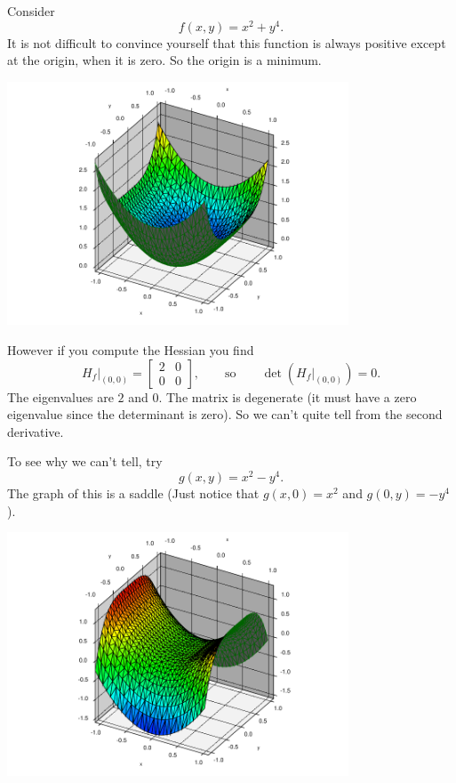 \documentclass[12pt]{article}
\begin{document}
Consider
$$
f(x,y) = x^2 + y^4 .
$$
It is not difficult to convince yourself that this function is always
positive except at the origin, when it is zero.  So the origin is a minimum.
\begin{center}
\includegraphics[width=4.0in]{degenerate-min.pdf}
\end{center}

However if you compute the Hessian  you find
$$
H_f\big|_{(0,0)} =
\begin{bmatrix}
2 & 0 \\
0 & 0
\end{bmatrix} ,
\qquad \text{so} \qquad
\det(H_f\big|_{(0,0)}) = 0 .
$$
The eigenvalues are $2$ and $0$.
The matrix is degenerate (it must have a zero eigenvalue since the
determinant is zero).  So we can't quite tell from the second derivative.

To see why we can't tell, try
$$
g(x,y) = x^2 - y^4 .
$$
The graph of this is a saddle (Just notice that $g(x,0) = x^2$ and
$g(0,y) = -y^4$).
\begin{center}
\includegraphics[width=4.0in]{degenerate-saddle.pdf}
\end{center}
\end{document}
